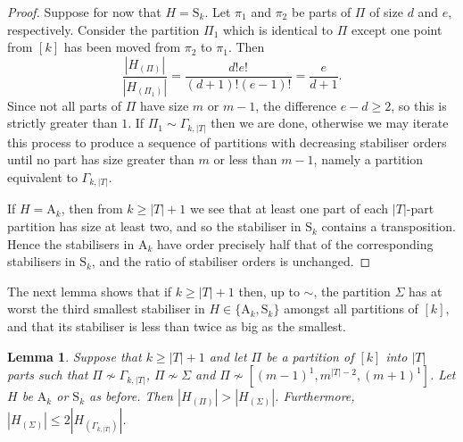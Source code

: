 \documentclass[twoside,a4paper,reqno,11pt]{amsart}
\newcommand{\<}{\langle}
\renewcommand{\>}{\rangle}
\newcommand{\leqs}{\leqslant}
\newcommand{\geqs}{\geqslant}
\def\ge{\geqs}
\newcommand{\Sn}{\mathrm{S}}
\newcommand{\An}{\mathrm{A}}
\newcommand{\minPart}{\Gamma_{k, |T|}}
\newtheorem{lem}[thm]{Lemma}
\theoremstyle{definition}
\begin{document}
\begin{proof}
   Suppose for now that $H = \Sn_k$.
   Let $\pi_1$ and $\pi_2$ be parts of $\Pi$ of size $d$ and $e$, respectively. Consider the partition $\Pi_1$ which is identical to $\Pi$ except one point from $[k]$ has been moved from $\pi_2$ to $\pi_1$. 
   Then \[\frac{|H_{(\Pi)}|}{|H_{(\Pi_1)}|} = \frac{d!e!}{(d+1)!(e-1)!} = \frac{e}{d+1}.\]
   Since not all parts of $\Pi$ have size $m$ or $m-1$, the difference $e-d \geqs 2$, so this is strictly greater than $1$. 
   If $\Pi_1 \sim \minPart$ then we are done, otherwise we may iterate this process to produce a sequence of partitions with decreasing stabiliser orders until no part has size greater than $m$ or less than $m-1$, namely a partition equivalent to $\minPart$.

   If $H = \An_k$, then from $k \geqs |T| + 1$ we see that at least one part of each $|T|$-part partition has size at least two, and so the stabiliser in $\Sn_k$ contains a transposition. Hence the stabilisers in $\An_k$ have order precisely half that of the corresponding stabilisers in $\Sn_k$, and the ratio of stabiliser orders is unchanged. 
\end{proof}


The next lemma shows that if $k \ge |T| + 1$ then,  up to $\sim$, the partition $\Sigma$ has at worst the third smallest stabiliser in $H \in \{\An_k, \Sn_k\}$ amongst all partitions of $[k]$, and that its stabiliser is less than twice as big as the smallest.

\begin{lem}
	\label{l:part}
	Suppose that $k \ge |T| + 1$ and  let $\Pi$ be a partition of $[k]$ into $|T|$ %
    parts such that $\Pi \not\sim \minPart$,  $\Pi \not\sim \Sigma$ and $\Pi \not \sim [(m-1)^1, m^{|T|-2}, (m+1)^{1}]$.  Let $H$ be $\An_k$ or $\Sn_k$ as before. Then $|H_{(\Pi)}| > |H_{(\Sigma)}|$. Furthermore, $|H_{(\Sigma)}| \leqs 2|H_{(\minPart)}|$.
\end{lem}
\end{document}
